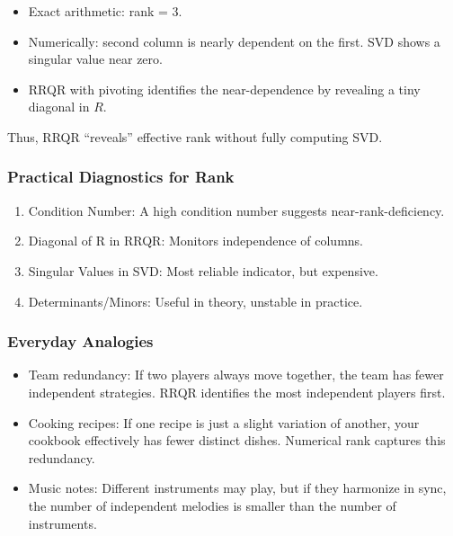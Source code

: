 \documentclass[
  letterpaper,
  DIV=11,
  numbers=noendperiod]{scrreprt}
\providecommand{\tightlist}{%
  \setlength{\itemsep}{0pt}\setlength{\parskip}{0pt}}
\begin{document}
\begin{itemize}
\tightlist
\item
  Exact arithmetic: rank = 3.
\item
  Numerically: second column is nearly dependent on the first. SVD shows
  a singular value near zero.
\item
  RRQR with pivoting identifies the near-dependence by revealing a tiny
  diagonal in \(R\).
\end{itemize}

Thus, RRQR ``reveals'' effective rank without fully computing SVD.

\subsubsection{Practical Diagnostics for
Rank}\label{practical-diagnostics-for-rank}

\begin{enumerate}
\def\labelenumi{\arabic{enumi}.}
\tightlist
\item
  Condition Number: A high condition number suggests
  near-rank-deficiency.
\item
  Diagonal of R in RRQR: Monitors independence of columns.
\item
  Singular Values in SVD: Most reliable indicator, but expensive.
\item
  Determinants/Minors: Useful in theory, unstable in practice.
\end{enumerate}

\subsubsection{Everyday Analogies}\label{everyday-analogies-85}

\begin{itemize}
\tightlist
\item
  Team redundancy: If two players always move together, the team has
  fewer independent strategies. RRQR identifies the most independent
  players first.
\item
  Cooking recipes: If one recipe is just a slight variation of another,
  your cookbook effectively has fewer distinct dishes. Numerical rank
  captures this redundancy.
\item
  Music notes: Different instruments may play, but if they harmonize in
  sync, the number of independent melodies is smaller than the number of
  instruments.
\end{itemize}
\end{document}

